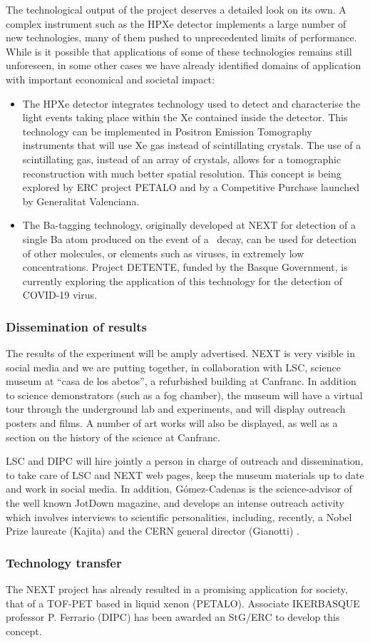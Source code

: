 The technological output of the project deserves a detailed look on its own. A complex instrument such as the HPXe detector implements a large number of new technologies, many of them pushed to unprecedented limits of performance. While is it possible that applications of some of these technologies remains still unforeseen, in some other cases we have already identified domains of application with important economical and societal impact: 
\begin{itemize}
\item The HPXe detector integrates technology used to detect and characterise the light events taking place within the Xe contained inside the detector. This technology can be implemented in Positron Emission Tomography instruments that will use Xe gas instead of scintillating crystals. The use of a scintillating gas, instead of an array of crystals, allows for a tomographic reconstruction with much better spatial resolution. This concept is being explored by ERC project PETALO and by a Competitive Purchase launched by Generalitat Valenciana.

\item The Ba-tagging technology, originally developed at NEXT for detection of a single Ba atom produced on the event of a \bbonu\ decay, can be used for detection of other molecules, or elements such as viruses, in extremely low concentrations. Project DETENTE, funded by the Basque Government, is currently exploring the application of this technology for the detection of COVID-19 virus. 
\end{itemize}

\subsubsection{Dissemination of results}

\indent
The results of the experiment will be amply advertised. NEXT is very visible in social media and we are putting together, in collaboration with LSC, science museum at ``casa de los abetos'', a refurbished building at Canfranc. In addition to science demonstrators (such as a fog chamber), the museum will have a virtual tour through the underground lab and experiments, and will display outreach posters and films. A number of art works will also be displayed, as well as a section on the history of the science at Canfranc. 

\indent

LSC and DIPC will hire jointly a person in charge of outreach and dissemination, to take care of LSC and NEXT web pages, keep the museum materials up to date and work in social media. In addition, G\'omez-Cadenas
is the science-advisor of the well known JotDown magazine, and develops an intense outreach activity which involves interviews to scientific personalities, including, recently, a Nobel Prize laureate (Kajita) and the CERN general director (Gianotti) .

\subsubsection{Technology transfer}
The NEXT project has already resulted in a promising application for society, that of a TOF-PET based in liquid xenon (PETALO). Associate IKERBASQUE professor P. Ferrario (DIPC) has been awarded an StG/ERC to develop this concept.


